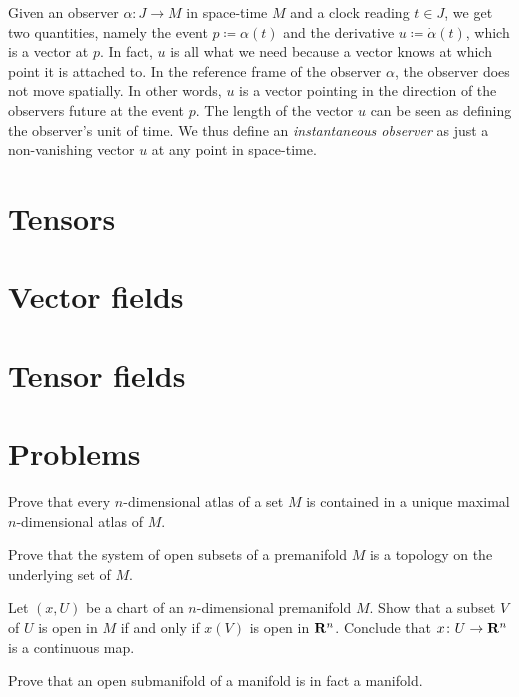 Given an observer $\alpha\colon J \to M$ in space-time $M$ and a clock reading
$t \in J$, we get two quantities, namely the event $p \coloneqq \alpha(t)$ and the
derivative $u \coloneqq \dot\alpha(t)$, which is a vector at $p$. In fact, $u$
is all what we need because a vector knows at which point it is attached to.
In the reference frame of the observer $\alpha$, the observer does not move spatially.
In other words, $u$ is a vector pointing in the direction of the observers
future at the event $p$. The length of the vector $u$ can be seen as defining
the observer's unit of time. We thus define an \emph{instantaneous observer}
as just a non-vanishing vector $u$ at any point in space-time.

\section{Tensors}

\section{Vector fields}

\section{Tensor fields}

\section{Problems}

\begin{xca}
  Prove that every $n$-dimensional atlas of a set $M$ is contained in a unique
  maximal $n$-dimensional atlas of $M$.
\end{xca}

\begin{xca}
  Prove that the system of open subsets of a premanifold $M$ is a topology on
  the underlying set of $M$.
\end{xca}

\begin{xca}
  Let $(x, U)$ be a chart of an $n$-dimensional premanifold $M$. Show that a 
  subset $V$ of $U$ is open in $M$ if and only if $x(V)$ is open in $\mathbf{R}^n$.
  Conclude that $x\colon U \to \mathbf{R}^n$ is a continuous map.
\end{xca}

\begin{xca}
  Prove that an open submanifold of a manifold is in fact a manifold.
\end{xca}

